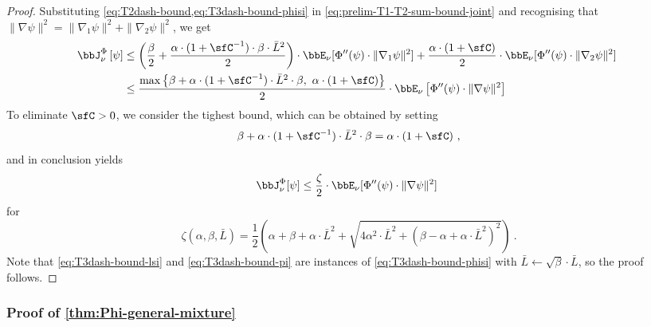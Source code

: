 \documentclass[11pt]{article}
\newcounter{ct}
\newcommand{\Phient}[3]{
    \ensuremath{\if$#3$\bbJ_{#1}^{#2}\else\bbJ_{#1}^{#2}\left[#3\right]\fi}}
\begin{document}
\begin{proof}
Substituting \cref{eq:T2dash-bound,eq:T3dash-bound-phisi} in \cref{eq:prelim-T1-T2-sum-bound-joint} and recognising that \(\|\nabla \psi\|^{2} = \|\nabla_{1}\psi\|^{2} + \|\nabla_{2}\psi\|^{2}\),
we get
\begin{align*}
    \Phient{\nu}{\Phi}{\psi} &\leq \left(\frac{\beta}{2} + \frac{\alpha \cdot (1 + \sfC^{-1}) \cdot \beta \cdot \bar{L}^{2}}{2}\right) \cdot \bbE_{\nu}[\Phi''(\psi) \cdot \|\nabla_{1}\psi\|^{2}] + \frac{\alpha \cdot (1 + \sfC)}{2} \cdot \bbE_{\nu}[\Phi''(\psi) \cdot \|\nabla_{2}\psi\|^{2}]~\\
    &\leq \frac{\max\left\{\beta + \alpha \cdot (1 + \sfC^{-1}) \cdot \bar{L}^{2} \cdot \beta,~\alpha \cdot (1 + \sfC) \right\}}{2} \cdot \bbE_{\nu}\left[\Phi''(\psi) \cdot \|\nabla \psi\|^{2}\right]~
\end{align*}
To eliminate \(\sfC >0\), we consider the tighest bound, which can be obtained by setting
\begin{equation*}
    \beta + \alpha \cdot (1 + \sfC^{-1}) \cdot \bar{L}^{2} \cdot \beta = \alpha \cdot (1 + \sfC)~,
\end{equation*}
and in conclusion yields
\begin{equation*}
    \bbJ_{\nu}^{\Phi}[\psi] \leq \frac{\zeta}{2}\cdot \bbE_{\nu}[\Phi''(\psi) \cdot \|\nabla \psi\|^{2}]~
\end{equation*}
for
\begin{equation*}
    \zeta(\alpha, \beta, \bar{L}) = \frac{1}{2}\left(\alpha + \beta + \alpha \cdot \bar{L}^{2} + \sqrt{4\alpha^{2} \cdot \bar{L}^{2} + (\beta - \alpha + \alpha \cdot \bar{L}^{2})^{2}}\right)~.
\end{equation*}
Note that \cref{eq:T3dash-bound-lsi} and \cref{eq:T3dash-bound-pi} are instances of \cref{eq:T3dash-bound-phisi} with \(\bar{L} \leftarrow \sqrt{\beta} \cdot \bar{L}\), so the proof follows.
\end{proof}

\subsubsection{Proof of \cref{thm:Phi-general-mixture}}
\label{sec:prf:mixture}
\end{document}
